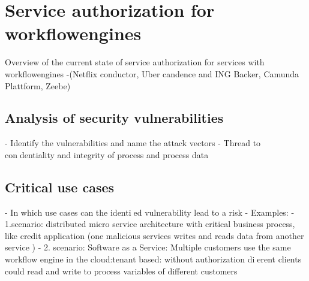 \section{Service authorization for workflowengines}\label{serviceAuthorizationForWorkflowengines}

Overview of the current state of service authorization for services with workflowengines
-(Netflix conductor, Uber candence and ING Backer, Camunda Plattform, Zeebe)

\subsection{Analysis of security vulnerabilities}\label{analysisVulnerabilities}
- Identify the vulnerabilities and name the attack vectors
- Thread to condentiality and integrity of process and process data

\subsection{Critical use cases}\label{criticalUseCases}
- In which use cases can the identied vulnerability lead to a risk
- Examples:
- 1.scenario: distributed micro service architecture with critical business process, like credit application
(one malicious services writes and reads data from another service )
- 2. scenario: Software as a Service: Multiple customers use the same workflow engine in the
cloud:tenant based: without authorization dierent clients could read and write to process variables
of different customers
